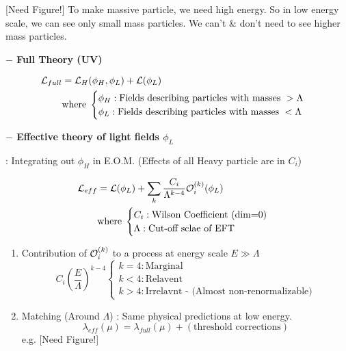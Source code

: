 \documentclass[11pt,letterpaper]{article}
\begin{document}
[Need Figure!] To make massive particle, we need high energy. So in low energy scale, we can see only small mass particles.
We can't \& don't need to see higher mass particles. 

\VS

{\bfseries $-$ Full Theory (UV)}

$$
\begin{aligned}
	\mathcal{L}_{full} &= \mathcal{L}_{H}(\phi_H, \phi_L) + \mathcal{L}(\phi_L) \\
	&\text{where} \hspace{0.1cm} 
	\begin{cases}
		\phi_H : \text{Fields describing particles with masses } >  \Lambda \\
		\phi_L : \text{Fields describing particles with masses }  < \Lambda
	\end{cases}
\end{aligned}
$$

\vs

{\bfseries $-$ Effective theory of light fields $\phi_L$}

\quad : Integrating out $\phi_H$ in E.O.M. (Effects of all Heavy particle are in $C_i$)

$$
\begin{aligned}
	\mathcal{L}_{eff} &= \mathcal{L}(\phi_L) + \sum_{k} \frac{C_i}{\Lambda^{k-4}}\mathcal{O}_i^{(k)} (\phi_L) \\
	&\text{where} \hspace{0.1cm}
	\begin{cases}
		C_i : \text{Wilson Coefficient (dim=0)} \\
		\Lambda : \text{Cut-off sclae of EFT}
	\end{cases}
\end{aligned}
$$

\begin{enumerate}[(1)]
	\item Contribution of $\mathcal{O}_i^{(k)}$ to a process at energy scale $E \gg \Lambda$ \newline
	$$C_i\left( \frac{E}{\Lambda} \right)^{k-4}
	\begin{cases}
		k = 4 : \text{Marginal} \\
		k<4 : \text{Relavent} \\
		k>4 : \text{Irrelavnt - (Almost non-renormalizable)}
	\end{cases}
	$$
	\item Matching (Around $\Lambda$) : Same physical predictions at low energy. \newline
	$$
	\lambda_{eff}(\mu)  = \lambda_{full}(\mu) + (\text{threshold corrections})
	$$ \newline
	e.g. [Need Figure!]
\end{enumerate}
\end{document}
